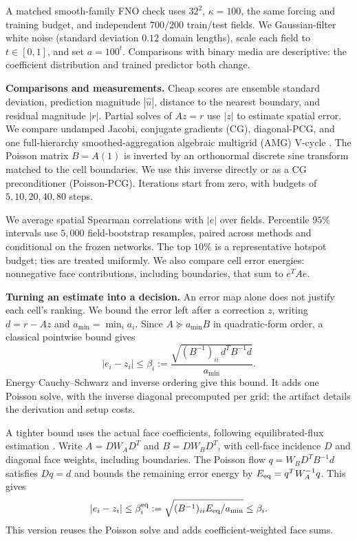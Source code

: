 \documentclass{article}
\begin{document}
A matched smooth-family FNO check uses $32^2$, $\kappa=100$, the same forcing and training budget,
and independent $700/200$ train/test fields. We Gaussian-filter white noise (standard deviation
$0.12$ domain lengths), scale each field to $t\in[0,1]$, and set $a=100^t$. Comparisons with binary
media are descriptive: the coefficient distribution and trained predictor both change.

\textbf{Comparisons and measurements.}
Cheap scores are ensemble standard deviation, prediction magnitude $|\hat u|$, distance to the
nearest boundary, and residual magnitude $|r|$. Partial solves of $Az=r$ use $|z|$ to estimate spatial
error. We compare undamped Jacobi, conjugate gradients (CG), diagonal-PCG, and one full-hierarchy
smoothed-aggregation algebraic multigrid (AMG) V-cycle \citep{bell2023pyamg}. The Poisson matrix
$B=A(1)$ is inverted by an orthonormal discrete sine transform matched to the cell boundaries.
We use this inverse directly or as a CG preconditioner (Poisson-PCG). Iterations start from zero,
with budgets of $5,10,20,40,80$ steps.

We average spatial Spearman correlations with $|e|$ over fields. Percentile $95\%$ intervals use
$5{,}000$ field-bootstrap resamples, paired across methods and conditional on the frozen networks.
The top $10\%$ is a representative hotspot budget; ties are treated uniformly. We also compare
cell error energies: nonnegative face contributions, including boundaries, that sum to $e^TAe$.

\textbf{Turning an estimate into a decision.}
An error map alone does not justify each cell's ranking. We bound the error left after a correction
$z$, writing $d=r-Az$ and $a_{\min}=\min_i a_i$. Since $A\succeq a_{\min}B$ in quadratic-form
order, a classical pointwise bound \citep{anwer2026pointwise} gives
\begin{equation}
 |e_i-z_i|\le\beta_i
 :=\frac{\sqrt{(B^{-1})_{ii}\,d^TB^{-1}d}}{a_{\min}}.
 \label{eq:bound}
\end{equation}
Energy Cauchy--Schwarz and inverse ordering give this bound. It adds one Poisson solve, with
the inverse diagonal precomputed per grid; the artifact details the derivation and setup costs.

A tighter bound uses the actual face coefficients, following equilibrated-flux estimation
\citep{ern2011unified}. Write $A=DW_AD^T$ and $B=DW_BD^T$, with cell-face incidence $D$
and diagonal face weights, including boundaries. The Poisson flow $q=W_BD^TB^{-1}d$ satisfies
$Dq=d$ and bounds the remaining error energy by $E_{\rm eq}=q^TW_A^{-1}q$. This gives
\begin{equation}
 |e_i-z_i|\le\beta_i^{\rm eq}:=\sqrt{(B^{-1})_{ii}E_{\rm eq}/a_{\min}}\le\beta_i.
 \label{eq:fluxbound}
\end{equation}
This version reuses the Poisson solve and adds coefficient-weighted face sums.
\end{document}
